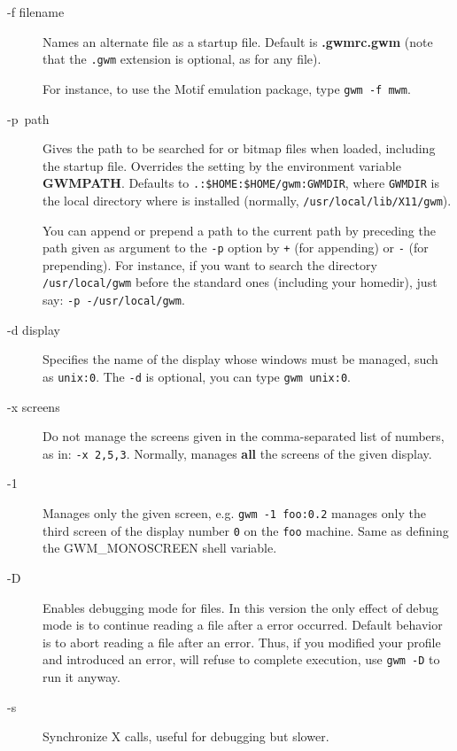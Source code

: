 \begin{description}

\item[-f filename] Names an alternate file as a {\GWM} startup file.
Default is {\bf .gwmrc.gwm} (note that the \verb".gwm" extension is
optional, as for any {\WOOL} file).\sloppy 

For instance, to use the {\sc Motif} emulation package, type
\verb"gwm -f mwm".

\item[-p~path] \label{GWMPATH}Gives the path to be searched for {\WOOL} or bitmap
files when loaded, including the startup file. Overrides the setting by the
environment variable {\bf GWMPATH}.  Defaults to \linebreak
\verb".:$HOME:$HOME/gwm:GWMDIR", where {\tt GWMDIR} is the local directory
where {\GWM} is installed (normally, {\tt /usr/local/lib/X11/gwm}).

You can append or prepend a path to the current path by preceding the path
given as argument to the \verb"-p" option by \verb"+" (for appending) or
\verb"-" (for prepending). For instance, if you want to search the directory
\verb"/usr/local/gwm" before the standard ones (including your homedir),
just say: \verb"-p -/usr/local/gwm".

\item[-d display] Specifies the name of the display whose windows must be
managed, such as \verb"unix:0". The \verb"-d" is optional, you can type
\verb"gwm unix:0".

\item[-x screens] Do not manage the screens given in the comma-separated
list of numbers, as in: {\tt -x 2,5,3}. Normally, {\GWM} manages {\bf all}
the screens of the given display.

\item[-1] Manages only the given screen, e.g. \verb"gwm -1 foo:0.2" manages
only the third screen of the display number \verb"0" on the \verb"foo"
machine. Same as defining the GWM\_MONOSCREEN shell variable.

\item[-D] Enables debugging mode for {\WOOL} files. In this version the only
effect of debug mode is to continue reading a file after a {\WOOL}
error occurred. Default behavior is to abort reading a file after an error.
Thus, if you modified your profile and introduced an error, {\GWM} will
refuse to complete execution, use {\tt gwm -D} to run it anyway.

\item[-s] Synchronize X calls, useful for debugging but slower.


\end{description}
